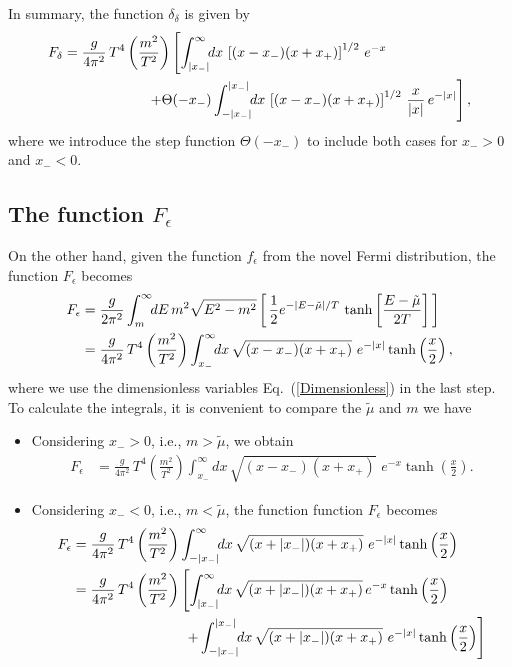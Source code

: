 \documentclass[sn-mathphys,Numbered]{sn-jnl}
\theoremstyle{thmstyleone}%
\theoremstyle{thmstyletwo}%
\theoremstyle{thmstylethree}%
\begin{document}
In summary, the function $\delta_\delta$ is given by
\begin{align}
F_\delta&=\frac{g}{4\pi^2}\,T^4\left(\frac{m^2}{T^2}\right)\left[\int^\infty_{|x_-|}\!\!dx\,\left[(x-x_-)(x+x_+)\right]^{1/2}\,e^{-x}\right.\notag\\
   &\qquad\qquad\qquad\left.+\Theta(-x_-)\int^{|x_-|}_{-|x_-|}\!\!dx\,\left[(x-x_-)(x+x_+)\right]^{1/2}\,\frac{x}{|x|}\,e^{-|x|}\right],
\end{align}
where we introduce the step function $\Theta(-x_-)$ to include both cases for $x_->0$ and $x_-<0$.

\subsection{The function $F_\epsilon$}
On the other hand, given the function $f_\epsilon$ from the novel Fermi distribution, the function $F_\epsilon$ becomes
\begin{align}
F_\epsilon&=\frac{g}{2\pi^2}\int^\infty_m\!\!dE\,m^2\sqrt{E^2-m^2} \left[\,\frac{1}{2}e^{-|E-\tilde\mu|/T}\,\tanh\bigg[\frac{E-\tilde\mu}{2T}\bigg]\,\right]\notag\\
&=\frac{g}{4\pi^2}\,T^4\left(\frac{m^2}{T^2}\right)\int^\infty_{x_-}\!\!dx\,\sqrt{(x-x_-)(x+x_+)}\,\,e^{-|x|}\tanh\left(\frac{x}{2}\right),
\end{align}
where we use the dimensionless variables Eq.~(\ref{Dimensionless}) in the last step.
To calculate the integrals, it is convenient to compare the $\tilde\mu$ and $m$ we have
\begin{itemize}
  \item Considering $x_->0$, i.e., $m>\tilde\mu$, we obtain
  \begin{align}
 F_\epsilon&=\frac{g}{4\pi^2}\,T^4\left(\frac{m^2}{T^2}\right)\int^\infty_{x_-}\!\!dx\,\sqrt{(x-x_-)(x+x_+)}\,\,e^{-x}\tanh\left(\frac{x}{2}\right).
  \end{align}
  \item Considering $x_-<0$, i.e., $m<\tilde\mu$, the function function $F_\epsilon$ becomes
  \begin{align}
  F_\epsilon&=\frac{g}{4\pi^2}\,T^4\left(\frac{m^2}{T^2}\right)\int^\infty_{-|x_-|}\!\!dx\,\sqrt{(x+|x_-|)(x+x_+)}\,\,e^{-|x|}
  \tanh\left(\frac{x}{2}\right)\notag\\
   &=\frac{g}{4\pi^2}\,T^4\left(\frac{m^2}{T^2}\right)\left[\int^\infty_{|x_-|}\!\!dx\,\sqrt{(x+|x_-|)(x+x_+)}\,e^{-x} \tanh\left(\frac{x}{2}\right)\right.\notag\\
   &\qquad\qquad\qquad\qquad\left.+\int^{|x_-|}_{-|x_-|}\!\!dx\,\sqrt{(x+|x_-|)(x+x_+)}\,\,e^{-|x|} \tanh\left(\frac{x}{2}\right)\right]
  \end{align}
\end{itemize}
\end{document}
